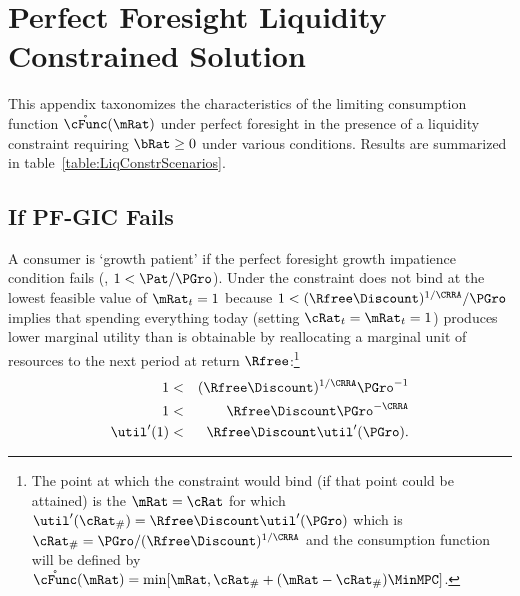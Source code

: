 \documentclass[../BufferStockTheory.tex]{subfiles}
\begin{document}
\newcommand{\FigDirApndx}{Code/Mathematica/Results/BufferStockTheory/Figures}

\section{Perfect Foresight Liquidity Constrained Solution}\label{sec:ApndxLiqConstr}

  This appendix taxonomizes the characteristics of the limiting
  consumption function $\mathring{\cFunc}(\mRat)$ under perfect
  foresight in the presence of a liquidity constraint requiring $\bRat
  \geq 0$ under various conditions.  Results are summarized in
  table~\ref{table:LiqConstrScenarios}.



\subsection{If PF-GIC Fails}

A consumer is `growth patient' if the perfect foresight growth
impatience condition fails (, $1 < \Pat/\PGro$).  Under
 the constraint does not bind at the lowest feasible value of $\mRat_{t}=1$ because
$1 < (\Rfree\Discount)^{1/\CRRA}/\PGro$ implies that spending
everything today (setting $\cRat_{t}=\mRat_{t}=1$) produces lower
marginal utility than is obtainable by reallocating a marginal unit of
resources to the next period at return $\Rfree$:\footnote{The point at
  which the constraint would bind (if that point could be attained) is
  the $\mRat=\cRat$ for which $\util^{\prime}(\cRat_{\#}) = \Rfree
  \Discount \util^{\prime}(\PGro)$ which is $\cRat_{\#} =
  \PGro/(\Rfree \Discount)^{1/\CRRA}$ and the consumption function
  will be defined by
  $\mathring{\cFunc}(\mRat)=\min[\mRat,\cRat_{\#}+(\mRat-\cRat_{\#})\MinMPC
  ]$.}
\begin{eqnarray}
1 & < & (\Rfree \Discount)^{1/\CRRA}\PGro^{-1}   \label{eq:EulerPFGICFails}
\\ 1 & < & \Rfree \Discount \PGro^{-\CRRA}
\\  \util^{\prime}(1) & < & \Rfree \Discount \util^{\prime}(\PGro)   \label{eq:EulerPFGICFailsEnd}.
\end{eqnarray}
\end{document}
